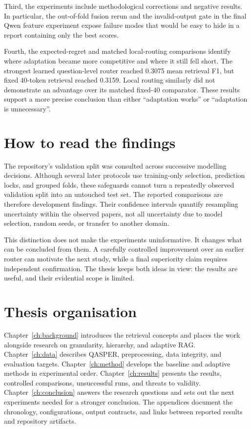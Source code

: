 Third, the experiments include methodological corrections and negative
results. In particular, the out-of-fold fusion rerun and the invalid-output
gate in the final Qwen feature experiment expose failure modes that would
be easy to hide in a report containing only the best scores.

Fourth, the expected-regret and matched local-routing comparisons identify
where adaptation became more competitive and where it still fell short.
The strongest learned question-level router reached 0.3075 mean retrieval
F1, but fixed 40-token retrieval reached 0.3159. Local routing similarly
did not demonstrate an advantage over its matched fixed-40 comparator.
These results support a more precise conclusion than either
\enquote{adaptation works} or \enquote{adaptation is unnecessary}.

\section{How to read the findings}
The repository's validation split was consulted across successive modelling
decisions. Although several later protocols use training-only selection,
prediction locks, and grouped folds, these safeguards cannot turn a
repeatedly observed validation split into an untouched test set. The
reported comparisons are therefore development findings. Their confidence
intervals quantify resampling uncertainty within the observed papers,
not all uncertainty due to model selection, random seeds, or transfer to
another domain.

This distinction does not make the experiments uninformative. It changes
what can be concluded from them. A carefully controlled improvement over
an earlier router can motivate the next study, while a final superiority
claim requires independent confirmation. The thesis keeps both ideas in
view: the results are useful, and their evidential scope is limited.

\section{Thesis organisation}
Chapter~\ref{ch:background} introduces the retrieval concepts and places
the work alongside research on granularity, hierarchy, and adaptive RAG.
Chapter~\ref{ch:data} describes QASPER, preprocessing, data integrity, and
evaluation targets. Chapter~\ref{ch:method} develops the baseline and
adaptive methods in experimental order. Chapter~\ref{ch:results} presents
the results, controlled comparisons, unsuccessful runs, and threats to
validity. Chapter~\ref{ch:conclusion} answers the research questions and
sets out the next experiments needed for a stronger conclusion. The
appendices document the chronology, configurations, output contracts,
and links between reported results and repository artifacts.
